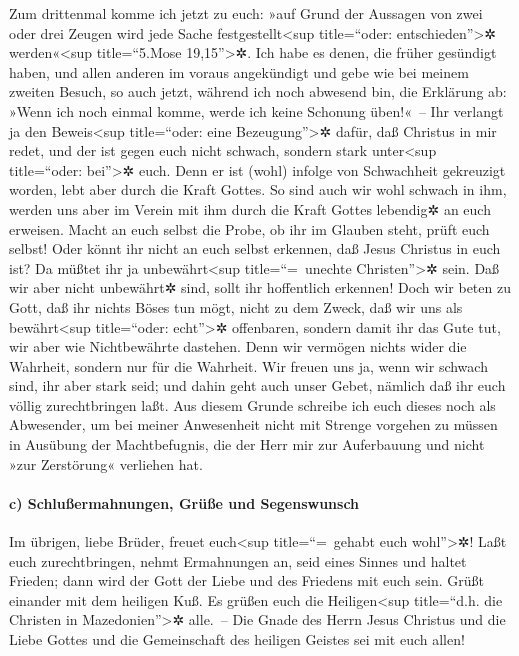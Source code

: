  Zum drittenmal komme ich jetzt zu euch: »auf Grund der
Aussagen von zwei oder drei Zeugen wird jede Sache
festgestellt\textless sup title=``oder: entschieden''\textgreater✲
werden«\textless sup title=``5.Mose 19,15''\textgreater✲. 
Ich habe es denen, die früher gesündigt haben, und allen anderen im
voraus angekündigt und gebe wie bei meinem zweiten Besuch, so auch
jetzt, während ich noch abwesend bin, die Erklärung ab: »Wenn ich noch
einmal komme, werde ich keine Schonung üben!«~--  Ihr
verlangt ja den Beweis\textless sup title=``oder: eine
Bezeugung''\textgreater✲ dafür, daß Christus in mir redet, und der ist
gegen euch nicht schwach, sondern stark unter\textless sup title=``oder:
bei''\textgreater✲ euch.  Denn er ist (wohl) infolge von
Schwachheit gekreuzigt worden, lebt aber durch die Kraft Gottes. So sind
auch wir wohl schwach in ihm, werden uns aber im Verein mit ihm durch
die Kraft Gottes lebendig✲ an euch erweisen.  Macht an
euch selbst die Probe, ob ihr im Glauben steht, prüft euch selbst! Oder
könnt ihr nicht an euch selbst erkennen, daß Jesus Christus in euch ist?
Da müßtet ihr ja unbewährt\textless sup title=``=~unechte
Christen''\textgreater✲ sein.  Daß wir aber nicht
unbewährt✲ sind, sollt ihr hoffentlich erkennen!  Doch wir
beten zu Gott, daß ihr nichts Böses tun mögt, nicht zu dem Zweck, daß
wir uns als bewährt\textless sup title=``oder: echt''\textgreater✲
offenbaren, sondern damit ihr das Gute tut, wir aber wie Nichtbewährte
dastehen.  Denn wir vermögen nichts wider die Wahrheit,
sondern nur für die Wahrheit.  Wir freuen uns ja, wenn wir
schwach sind, ihr aber stark seid; und dahin geht auch unser Gebet,
nämlich daß ihr euch völlig zurechtbringen laßt.  Aus
diesem Grunde schreibe ich euch dieses noch als Abwesender, um bei
meiner Anwesenheit nicht mit Strenge vorgehen zu müssen in Ausübung der
Machtbefugnis, die der Herr mir zur Auferbauung und nicht »zur
Zerstörung« verliehen hat.

\hypertarget{c-schluuxdfermahnungen-gruxfcuxdfe-und-segenswunsch}{%
\paragraph{c) Schlußermahnungen, Grüße und
Segenswunsch}\label{c-schluuxdfermahnungen-gruxfcuxdfe-und-segenswunsch}}

 Im übrigen, liebe Brüder, freuet euch\textless sup
title=``=~gehabt euch wohl''\textgreater✲! Laßt euch zurechtbringen,
nehmt Ermahnungen an, seid eines Sinnes und haltet Frieden; dann wird
der Gott der Liebe und des Friedens mit euch sein.  Grüßt
einander mit dem heiligen Kuß. Es grüßen euch die Heiligen\textless sup
title=``d.h. die Christen in Mazedonien''\textgreater✲ alle.~--
 Die Gnade des Herrn Jesus Christus und die Liebe Gottes
und die Gemeinschaft des heiligen Geistes sei mit euch allen!
